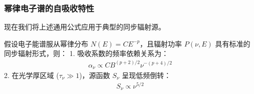 \subsubsection{幂律电子谱的自吸收特性}

现在我们将上述通用公式应用于典型的同步辐射源。

\begin{theorem}[幂律谱下的吸收系数与源函数]
    假设电子能谱服从幂律分布 $N(E) = C E^{-p}$，且辐射功率 $P(\nu, E)$ 具有标准的同步辐射形式，则：
    1. 吸收系数的频率依赖关系为：
    \begin{align}
        \alpha_{\nu} \propto C B^{(p+2)/2} \nu^{-(p+4)/2} \label{eq:powerlaw_alpha}
    \end{align}
    2. 在光学厚区域 ($\tau_{\nu} \gg 1$)，源函数 $S_{\nu}$ 呈现低频倒转：
    \begin{align}
        S_{\nu} \propto \nu^{5/2} \label{eq:source_function_5_2}
    \end{align}
\end{theorem}

